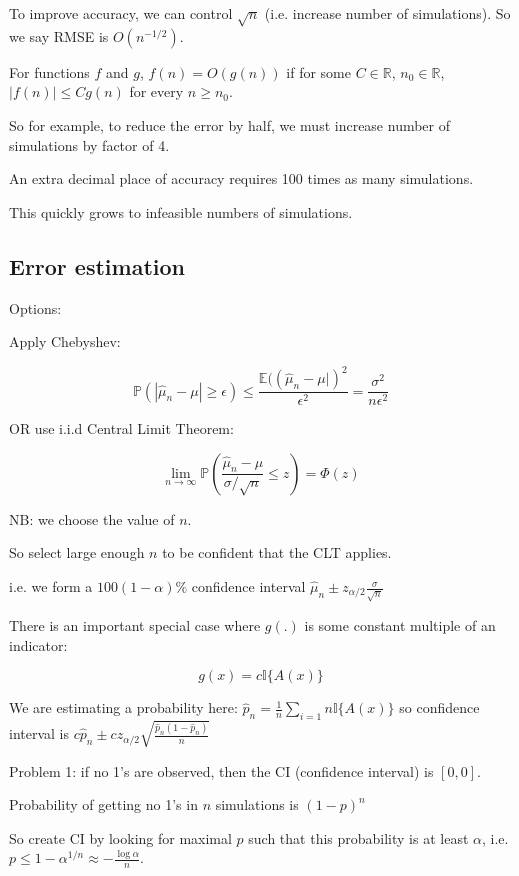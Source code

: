 To improve accuracy, we can control $\sqrt{n}$ (i.e. increase number of simulations). So we say RMSE is $O(n^{-1 / 2})$.

\begin{definition}
	For functions $f$ and $g$, $f(n) = O(g(n))$ if for some $C \in \mathbb{R}$, $n_0 \in \mathbb{R}$, $|f(n)| \le C g(n)$ for every $n \ge n_0$.
\end{definition}

So for example, to reduce the error by half, we must increase number of simulations by factor of 4.

An extra decimal place of accuracy requires 100 times as many simulations.

This quickly grows to infeasible numbers of simulations.

\subsection{Error estimation}

Options:

Apply Chebyshev:

\[\mathbb{P}(|\hat{\mu}_n - \mu| \ge \epsilon) \le \frac{\mathbb{E}((\hat{\mu}_n - \mu|)^2}{\epsilon^2} = \frac{\sigma^2}{n \epsilon^2}\]

OR use i.i.d Central Limit Theorem:

\[\lim_{n \rightarrow \infty} \mathbb{P}(\frac{\hat{\mu}_n - \mu}{\sigma / \sqrt{n}} \le z) = \Phi (z)\]

NB: we choose the value of $n$.

So select large enough $n$ to be confident that the CLT applies.

i.e. we form a $100(1 - \alpha)\%$ confidence interval $\hat{\mu}_n \pm z_{\alpha / 2} \frac{\sigma}{\sqrt{n}}$

There is an important special case where $g(.)$ is some constant multiple of an indicator:

\[g(x) = c \mathbb{I} \{A(x)\}\]

We are estimating a probability here: $\hat{p}_n = \frac{1}{n} \sum_{i = 1}{n} \mathbb{I} \{ A(x) \}$ so confidence interval is $c\hat{p}_n \pm c z_{\alpha / 2} \sqrt{\frac{\hat{p}_n(1 - \hat{p}_n)}{n}}$

Problem 1: if no 1's are observed, then the CI (confidence interval) is $[0, 0]$.

Probability of getting no 1's in $n$ simulations is ${(1 - p)}^n$

So create CI by looking for maximal $p$ such that this probability is at least $\alpha$, i.e. $p \le 1 - \alpha^{1 / n} \approx -\frac{\log \alpha}{n}$.

